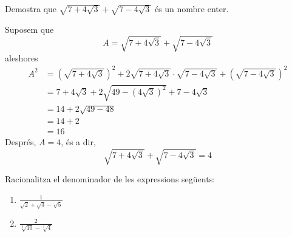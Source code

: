 \begin{exercici}
Demostra que $\sqrt{7+4\sqrt{3}}+\sqrt{7-4\sqrt{3}}$ és un nombre
enter.

\end{exercici}

\begin{solucio}
Suposem que%
\begin{equation*}
A=\sqrt{7+4\sqrt{3}}+\sqrt{7-4\sqrt{3}}
\end{equation*}%
aleshores%
\begin{align*}
A^{2} &=\left( \sqrt{7+4\sqrt{3}}\right) ^{2}+2\sqrt{7+4\sqrt{3}}\cdot 
\sqrt{7-4\sqrt{3}}+\left( \sqrt{7-4\sqrt{3}}\right) ^{2} \\
&=7+4\sqrt{3}+2\sqrt{49-\left( 4\sqrt{3}\right) ^{2}}+7-4\sqrt{3} \\
&=14+2\sqrt{49-48} \\
&=14+2 \\
&=16
\end{align*}%
Després, $A=4$, és a dir, 
\begin{equation*}
\sqrt{7+4\sqrt{3}}+\sqrt{7-4\sqrt{3}}=4
\end{equation*}
\end{solucio}

\begin{exercici}
Racionalitza el denominador de les expressions següents:

\begin{enumerate}
\item[a)] $\frac{1}{\sqrt{2}+\sqrt{3}-\sqrt{5}}$

\item[b)] $\frac{2}{\sqrt[3]{10}-\sqrt[3]{4}}$
\end{enumerate}

\end{exercici}

